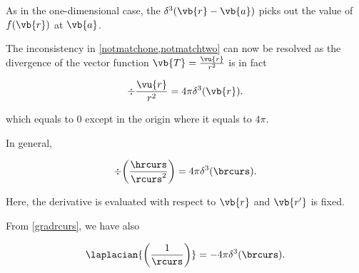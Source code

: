 \documentclass[english,a4paper,12pt]{report}
\begin{document}
As in the one-dimensional case, the \(\delta^3(\vb{r} - \vb{a})\) picks out the value of \(f(\vb{r})\) at \(\vb{a}\).
	
The inconsistency in \cref{notmatchone,notmatchtwo} can now be resolved as the divergence of the vector function \(\vb{T} = \frac{\vu{r}}{r^2}\) is in fact
	
\begin{equation} 
	\div{\frac{\vu{r}}{r^2}} = 4\pi\delta^3(\vb{r}). 
\end{equation}
	 
which equals to 0 except in the origin where it equals to \(4\pi\).
	
In general,
	
\begin{equation} 
	\div{\left(\frac{\hrcurs}{\rcurs^2}\right)} = 4\pi\delta^3(\brcurs). \label{divdelta} 
\end{equation} 
 	
Here, the derivative is evaluated with respect to \(\vb{r}\) and \(\vb{r'}\) is fixed.
 	
From \cref{gradrcurs}, we have also
 	
\begin{equation} 
	\laplacian{\left(\frac{1}{\rcurs}\right)} = -4\pi\delta^3(\brcurs). \label{laprj} 
\end{equation}
	


\end{document}
